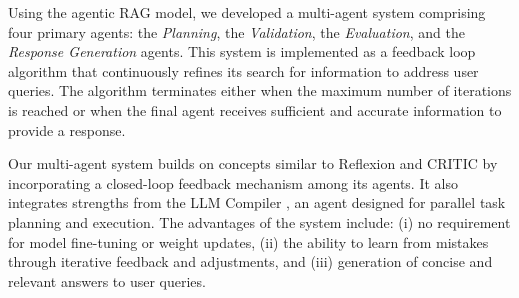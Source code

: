 \documentclass[runningheads]{llncs}
\begin{document}
Using the agentic RAG model, we developed a multi-agent system comprising four primary agents: the \textit{Planning}, the \textit{Validation}, the \textit{Evaluation}, and the \textit{Response Generation} agents. This system is implemented as a feedback loop algorithm that continuously refines its search for information to address user queries. The algorithm terminates either when the maximum number of iterations is reached or when the final agent receives sufficient and accurate information to provide a response.

Our multi-agent system builds on concepts similar to Reflexion \cite{shinn2023reflexion} and CRITIC \cite{gou2024criticlargelanguagemodels} by incorporating a closed-loop feedback mechanism among its agents. It also integrates strengths from the LLM Compiler \cite{kim2023llmcompiler}, an agent designed for parallel task planning and execution. The advantages of the system include: (i) no requirement for model fine-tuning or weight updates, (ii) the ability to learn from mistakes through iterative feedback and adjustments, and (iii) generation of concise and relevant answers to user queries.
\end{document}
